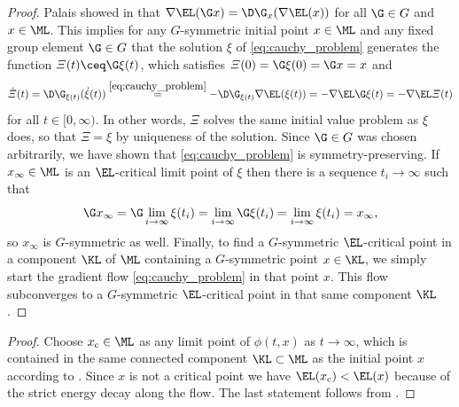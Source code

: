\begin{proof}
Palais showed in \cite[Section 2]{palais_1979} that 
$\nabla\EL(\G x)=
\D\G_x(\nabla\EL(x))$ for all $\G\in G$ and $x\in\ML$. 
This implies for any $G$-symmetric
initial point $x\in\ML$ and any fixed group element $\G\in G$ that
the solution $\xi$ of \cref{eq:cauchy_problem}
generates the
function $\varXi(t) \ceq \G\xi(t)$, which satisfies $\varXi(0)=\G\xi(0)=
\G x=x$ and
$$
\dot{\varXi}(t)=\D\G_{\xi(t)}(\dot\xi(t))\overset{\cref{eq:cauchy_problem}}{=}
-\D\G_{\xi(t)}\nabla\EL(\xi(t))=-\nabla\EL\G\xi(t)=-\nabla\EL\varXi(t)
$$
for all $t\in [0,\infty)$. 
In other words, $\varXi$ solves the same initial
value problem as $\xi$ does, so that $\varXi=\xi$ by uniqueness of the solution.
Since $\G\in G$ was chosen arbitrarily, we have shown that \cref{eq:cauchy_problem} is 
symmetry-preserving. If $x_\infty\in\ML$ is an $\EL$-critical limit point of 
$\xi$ then there is a sequence 
$t_i\to\infty$ such that 
$$
\G x_\infty=\G \lim_{i\to\infty}\xi(t_i)=\lim_{i\to\infty}\G\xi(t_i)=
\lim_{i\to\infty}\xi(t_i)=x_\infty,
$$
so $x_\infty $ is $G$-symmetric as well. Finally, to find a $G$-symmetric
$\EL$-critical point in a component $\KL$ of $\ML$ containing a $G$-symmetric
point $x\in\KL$, we simply start the gradient flow \cref{eq:cauchy_problem}
in that point $x$. This flow subconverges to a 
$G$-symmetric $\EL$-critical point
in that same component $\KL$.
\end{proof}
\begin{proof}
	Choose $x_{\text{c}}\in\ML$ as any limit point of $\phi(t,x)$
	as $t\to\infty$, 
	which is contained in the same connected
	component $\KL\subset\ML$ as the initial point $x$ according
	to . 
	Since $x$ is not a critical point we have $\EL(x_\text{c})<\EL(x)$
	because of the strict energy decay along the flow. The last
	statement follows from .
\end{proof}
